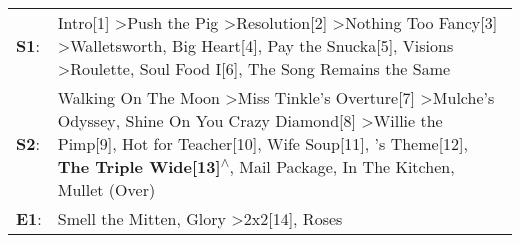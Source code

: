 \begin{supertabular}{p{0.03\textwidth}p{0.92\textwidth}}
 \textbf{S1}:  &                                                                                       Intro[1]\textsuperscript{} \textgreater \enspace Push the Pig\textsuperscript{} \textgreater \enspace Resolution[2]\textsuperscript{} \textgreater \enspace Nothing Too Fancy[3]\textsuperscript{} \textgreater \enspace Walletsworth\textsuperscript{}, \enspace Big Heart[4]\textsuperscript{}, \enspace Pay the Snucka[5]\textsuperscript{}, \enspace Visions\textsuperscript{} \textgreater \enspace Roulette\textsuperscript{}, \enspace Soul Food I[6]\textsuperscript{}, \enspace The Song Remains the Same\textsuperscript{}  \enspace  \\
 \textbf{S2}:  &  Walking On The Moon\textsuperscript{} \textgreater \enspace Miss Tinkle's Overture[7]\textsuperscript{} \textgreater \enspace Mulche's Odyssey\textsuperscript{}, \enspace Shine On You Crazy Diamond[8]\textsuperscript{} \textgreater \enspace Willie the Pimp[9]\textsuperscript{}, \enspace Hot for Teacher[10]\textsuperscript{}, \enspace Wife Soup[11]\textsuperscript{}, 's Theme[12]\textsuperscript{}, \enspace \textbf{The Triple Wide[13]\textsuperscript{$\wedge$}}, \enspace Mail Package\textsuperscript{}, \enspace In The Kitchen\textsuperscript{}, \enspace Mullet (Over)\textsuperscript{}  \enspace  \\
 \textbf{E1}:  &                                                                                                                                                                                                                                                                                                                                                                                                                                                                     Smell the Mitten\textsuperscript{}, \enspace Glory\textsuperscript{} \textgreater \enspace 2x2[14]\textsuperscript{}, \enspace Roses\textsuperscript{}  \enspace  \\
\end{supertabular}
